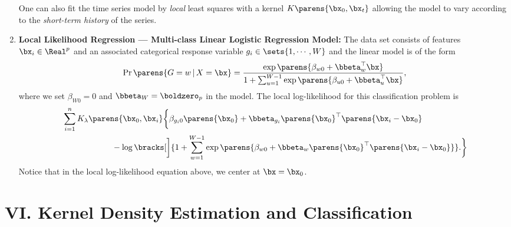 \documentclass[12pt]{article}
\begin{document}
\begin{enumerate}[label=\textbf{\arabic*.}]
	One can also fit the time series model by \emph{local} least squares with a kernel $K \parens{\bx_0, \bx_t}$ allowing the model to vary according to the \textit{short-term history} of the series. 
	
	\item \textbf{Local Likelihood Regression --- Multi-class Linear Logistic Regression Model:} The data set consists of features $\bx_i \in \Real^p$ and an associated categorical response variable $g_i \in \sets{ 1, \cdots, W }$ and the linear model is of the form 
	\begin{align*}
		\Pr \parens{ G = w \,\vert\, X = \bx } = \frac{\exp\parens{\beta_{w0} + \bbeta_{w}^\top \bx}}{ 1 + \sum_{u=1}^{W-1} \exp \parens{\beta_{u0} + \bbeta_{u}^\top \bx}}, 
	\end{align*}
	where we set $\beta_{W0} = 0$ and $\bbeta_W = \boldzero_p$ in the model. The local log-likelihood for this classification problem is 
	\begin{align*}
		& \sum_{i=1}^n K_{\lambda} \parens{\bx_0, \bx_i} \bigg\{ \beta_{g_i 0} \parens{\bx_0} + \bbeta_{g_i} \parens{\bx_0}^\top \parens{\bx_i - \bx_0} \nonumber \\ 
		& \qquad \qquad \qquad - \log \bracks[\bigg]{ 1 + \sum_{w=1}^{W-1} \exp \parens{\beta_{w0} + \bbeta_w \parens{\bx_0}^\top \parens{\bx_i - \bx_0}} }. 
		\bigg\}
	\end{align*}
	Notice that in the local log-likelihood equation above, we center at $\bx = \bx_0$. 
\end{enumerate}


\section*{VI. Kernel Density Estimation and Classification} 
\end{document}
